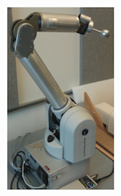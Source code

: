 \begin{figure}[]
    \begin{subfigure}[]{0.438\linewidth}
        \includegraphics[width=\linewidth]{images/wam_p}
        \caption{}
    \end{subfigure}
    \begin{subfigure}[]{0.490\linewidth}

\end{subfigure}
\end{figure}
